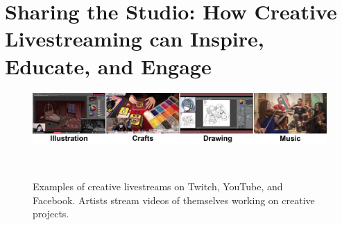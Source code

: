 


\chapter{Sharing the Studio: How Creative Livestreaming can Inspire, Educate, and Engage}

\begin{figure}[b!]
\centering
  \includegraphics[width=\textwidth]{livestreams/figures/examples-horizontal.png}
  \caption{Examples of creative livestreams on Twitch, YouTube, and Facebook. Artists stream videos of themselves working on creative projects\protect\footnotemark.}~\label{fig:livestream_examples}
\end{figure}


